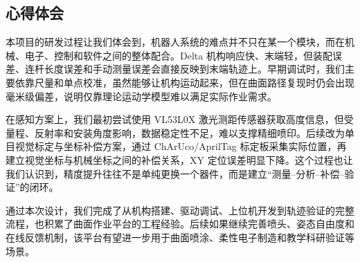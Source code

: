 ﻿\documentclass[UTF8,zihao=-4,fontset=windows]{ctexart}
\begin{document}
\subsection{心得体会}
本项目的研发过程让我们体会到，机器人系统的难点并不只在某一个模块，而在机械、电子、控制和软件之间的整体配合。Delta 机构响应快、末端轻，但装配误差、连杆长度误差和手动测量误差会直接反映到末端轨迹上。早期调试时，我们主要依靠尺量和单点校准，虽然能够让机构运动起来，但在曲面路径复现时仍会出现毫米级偏差，说明仅靠理论运动学模型\cite{hadfield2020delta}难以满足实际作业需求。

在感知方案上，我们最初尝试使用 VL53L0X 激光测距传感器获取高度信息，但受量程、反射率和安装角度影响，数据稳定性不足，难以支撑精细喷印。后续改为单目视觉标定与坐标补偿方案，通过 ChArUco/AprilTag 标定板采集实际位置，再建立视觉坐标与机械坐标之间的补偿关系\cite{zhang2000calibration,garrido2014aruco,olson2011apriltag}，XY 定位误差明显下降。这个过程也让我们认识到，精度提升往往不是单纯更换一个器件，而是建立“测量--分析--补偿--验证”的闭环。

通过本次设计，我们完成了从机构搭建、驱动调试、上位机开发到轨迹验证的完整流程，也积累了曲面作业平台的工程经验。后续如果继续完善喷头、姿态自由度和在线反馈机制，该平台有望进一步用于曲面喷涂、柔性电子制造和教学科研验证等场景。

\end{document}
